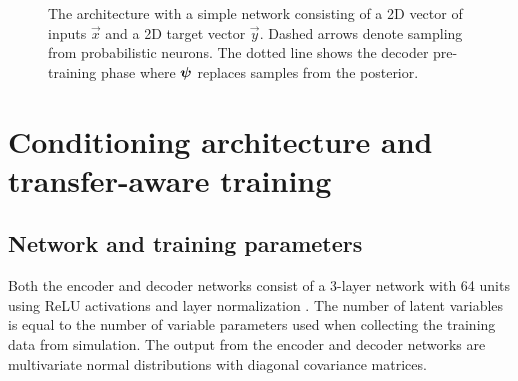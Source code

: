 \begin{figure}
\caption{The \dettostoc{} architecture with a simple network consisting of a 2D vector of inputs $\vec{x}$ and a 2D target vector $\vec{y}$. Dashed arrows denote sampling from probabilistic neurons. The dotted line shows the decoder pre-training phase where $\boldsymbol{\psi}$ replaces samples from the posterior.}
\label{fig:det2stoc_architecture}
\end{figure}

\section{Conditioning architecture and transfer-aware training}

\subsection{Network and training parameters}
Both the encoder and decoder networks consist of a 3-layer network with 64 units using ReLU activations and layer normalization \parencite{Ba2016}. The number of latent variables is equal to the number of variable parameters used when collecting the training data from simulation. The output from the encoder and decoder networks are multivariate normal distributions with diagonal covariance matrices.

